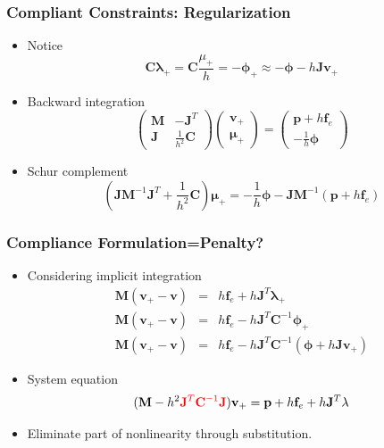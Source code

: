\documentclass[serif,mathserif]{beamer}
\newcommand{\BOLD}[1]{\mathbf{#1}}
\newcommand{\PDIF}[2]{\frac{\partial #1}{\partial #2}}
\begin{document}
\begin{frame}
 \frametitle{Compliant Constraints: Regularization}
 \begin{itemize}
  \item Notice
  \begin{equation*}
   \BOLD{C\lambda}_+ = \BOLD{C}\frac{\mu_+}{h}=-\BOLD{\BOLD{\phi}}_+\approx-\BOLD{\phi}-h\BOLD{Jv}_+
  \end{equation*}
  \item Backward integration
    \begin{equation*}
     \begin{pmatrix}
      \BOLD{M} & -\BOLD{J}^T \\
      \BOLD{J} & \frac{1}{h^2}\BOLD{C}
     \end{pmatrix}
     \begin{pmatrix}
      \BOLD{v}_+ \\ \BOLD{\mu}_+
     \end{pmatrix}
     =
     \begin{pmatrix}
      \BOLD{p}+h\BOLD{f}_e \\ -\frac{1}{h}\BOLD{\phi}
     \end{pmatrix}
    \end{equation*}
  \item Schur complement
    \begin{equation*}
      (\BOLD{JM}^{-1}\BOLD{J}^T + \frac{1}{h^2}\BOLD{C})\BOLD{\mu}_+ = -\frac{1}{h}\BOLD{\phi}-\BOLD{JM}^{-1}(\BOLD{p}+h\BOLD{f}_e)
    \end{equation*}
 \end{itemize}
\end{frame}

\begin{frame}
 \frametitle{Compliance Formulation=Penalty?}
 \begin{itemize}
  \item Considering implicit integration
    \begin{eqnarray*}
      \BOLD{M}(\BOLD{v}_+-\BOLD{v}) &=& h\BOLD{f}_{e}+h\BOLD{J}^T\BOLD{\lambda}_+ \\
      \BOLD{M}(\BOLD{v}_+-\BOLD{v}) &=& h\BOLD{f}_{e}-h\BOLD{J}^T\BOLD{C}^{-1}\BOLD{\phi}_+ \\
      \BOLD{M}(\BOLD{v}_+-\BOLD{v}) &=& h\BOLD{f}_{e}-h\BOLD{J}^T\BOLD{C}^{-1}(\BOLD{\phi}+h\BOLD{Jv}_+)
    \end{eqnarray*}
  \item System equation 
    \begin{equation*}
      (\BOLD{M}-h^2{\color{red}\BOLD{J}^T\BOLD{C}^{-1}\BOLD{J}})\BOLD{v}_+ = \BOLD{p}+h\BOLD{f}_{e}+h\BOLD{J}^T\BOLD{\lambda}
    \end{equation*}
  \pause
  \TikzDraw {
    \node at (-0.4, -0.5) {\huge \color{red} $\neq \PDIF{\BOLD{f}_c}{\BOLD{x}}$};
  }
  \item Eliminate part of nonlinearity through substitution.
 \end{itemize}
\end{frame}
\end{document}
